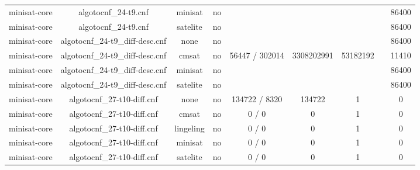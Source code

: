 \begin{appendices}
\begin{table}[p]
\begin{center}
\begin{tabular}{l|cccccccc}
  minisat-core                   & algotocnf\_24-t9.cnf           & minisat    & no    &            &           &           &            & 86400 \\ %
  minisat-core                   & algotocnf\_24-t9.cnf           & satelite   & no    &            &           &           &            & 86400 \\ %
  minisat-core                   & algotocnf\_24-t9\_diff-desc.cnf & none       & no    &            &           &           &            & 86400 \\ %
  minisat-core                   & algotocnf\_24-t9\_diff-desc.cnf & cmsat      & no    & 56447 / 302014 & 3308202991 & 53182192  &            & 11410 \\ %
  minisat-core                   & algotocnf\_24-t9\_diff-desc.cnf & minisat    & no    &            &           &           &            & 86400 \\ %
  minisat-core                   & algotocnf\_24-t9\_diff-desc.cnf & satelite   & no    &            &           &           &            & 86400 \\ %
  minisat-core                   & algotocnf\_27-t10-diff.cnf     & none       & no    & 134722 / 8320 & 134722    & 1         &            & 0 \\ %
  minisat-core                   & algotocnf\_27-t10-diff.cnf     & cmsat      & no    & 0 / 0      & 0         & 1         &            & 0 \\ %
  minisat-core                   & algotocnf\_27-t10-diff.cnf     & lingeling  & no    & 0 / 0      & 0         & 1         &            & 0 \\ %
  minisat-core                   & algotocnf\_27-t10-diff.cnf     & minisat    & no    & 0 / 0      & 0         & 1         &            & 0 \\ %
  minisat-core                   & algotocnf\_27-t10-diff.cnf     & satelite   & no    & 0 / 0      & 0         & 1         &            & 0 \\ %

\end{tabular}
\end{center}
\end{table}
\end{appendices}
